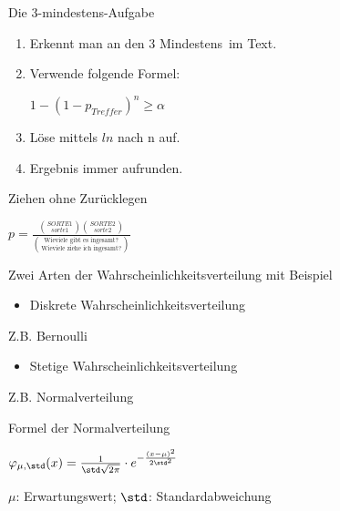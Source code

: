 \documentclass[paper=a6,landscape,ngerman,twoside=true,fontsize=12pt]{scrartcl}
\begin{document}
\begin{frage}
	Die 3-mindestens-Aufgabe
	
\end{frage}
\begin{antwort}
	\begin{enumerate}
		\item Erkennt man an den 3 \glqq Mindestens\grqq~im Text. 
		\item Verwende folgende Formel:
		
		 $1-(1-p_{Treffer})^n\geq \alpha$
		\item Löse mittels $ln$ nach  n auf.
		\item Ergebnis immer aufrunden.
	\end{enumerate}
	
\end{antwort}
\begin{frage}
	Ziehen ohne Zurücklegen
	
\end{frage}
\begin{antwort}
	\LARGE
	 $p=\frac{\binom{SORTE1}{sorte1}\binom{SORTE2}{sorte2}}{\binom{\text{Wieviele gibt es ingesamt?}}{\text{Wieviele ziehe ich ingesamt?}}}$
	
\end{antwort}
\begin{frage}
	Zwei Arten der Wahrscheinlichkeitsverteilung mit Beispiel
	
\end{frage}
\begin{antwort}
	\begin{itemize}
		\item Diskrete Wahrscheinlichkeitsverteilung
	\end{itemize}
	Z.B. Bernoulli
	\begin{itemize}
		\item Stetige Wahrscheinlichkeitsverteilung
	\end{itemize}
	Z.B. Normalverteilung
\end{antwort}	
\begin{frage}
	Formel der Normalverteilung
\end{frage}
\begin{antwort}
	\begin{center}
		$\huge\varphi_{\mu,\std}(x)=\frac{1}{\std\sqrt{2\pi}}\cdot e^{-\frac{(x-\mu)^2}{2\std^2}}$
		\vspace{1cm}
		
		$\mu$: Erwartungswert; $\std$: Standardabweichung
	\end{center}
\end{antwort}	
\end{document}
